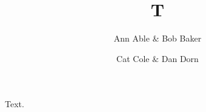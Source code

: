 \documentclass{amsart}
\begin{document}
\title{T}
\author{Ann Able $\&$ Bob Baker}
\address{Univ X}
\author{Cat Cole $\&$ Dan Dorn}
\address{Univ Z}
\maketitle
Text.
\end{document}
